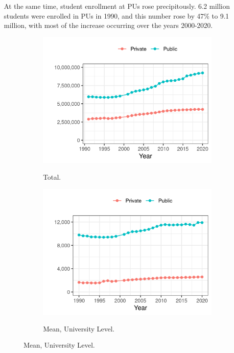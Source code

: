 \documentclass[notitlepage,12pt]{article}
\begin{document}
At the same time, student enrollment at PUs rose precipitously.
6.2 million students were enrolled in PUs in 1990, and this number rose by 47\% to 9.1 million, with most of the increase occurring over the years 2000-2020.
\begin{figure}[h!]
    \centering
    \caption{Total Student Enrollment, by University Sector, and Year.}
    \begin{subfigure}[b]{0.495\textwidth}
        \centering
        \caption{Total.}
        \includegraphics[width=\textwidth]{figures/enrollment-total.png}
        \label{fig:enrollment-total}
    \end{subfigure}
    \begin{subfigure}[b]{0.495\textwidth}
        \centering
        \caption{Mean, University Level.}
        \includegraphics[width=\textwidth]{figures/enrollment-mean.png}
        \label{fig:enrollment-mean}
    \end{subfigure}
    \label{fig:enrollment}
\end{figure}
\end{document}

